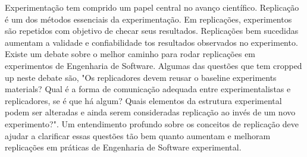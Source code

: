 Experimentação tem comprido um papel central no avanço científico. Replicação é um
dos métodos essenciais da experimentação. Em replicações, experimentos são repetidos com objetivo
de checar seus resultados. Replicações bem sucedidas aumentam a validade e confiabilidade
tos resultados observados no experimento.
Existe um debate sobre o melhor caminho para rodar replicações em experimentos de Engenharia de Software.
Algumas das questões que tem cropped up neste debate são, "Os replicadores devem reusar
o baseline experiments materials? Qual é a forma de comunicação adequada entre
experimentalistas e replicadores, se é que há algum? Quais elementos da estrutura experimental
podem ser alteradas e ainda serem consideradas replicação ao invés de um novo experimento?".
Um entendimento profundo sobre os conceitos de replicação deve ajudar a clarificar essas questões tão bem quanto
aumentam e melhoram replicações em práticas de Engenharia de Software experimental.
\cite{juristo_replication_2012}

